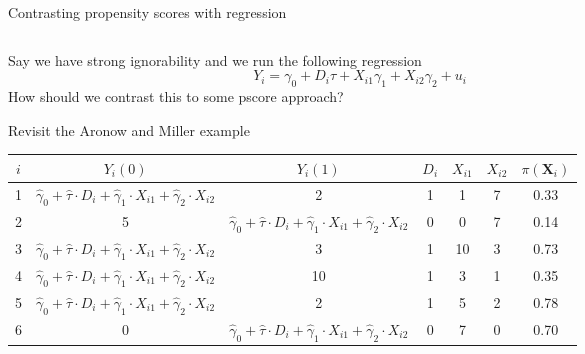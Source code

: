 \documentclass[notes,11pt, aspectratio=169]{beamer}
\newenvironment{wideitemize}{\itemize\addtolength{\itemsep}{10pt}}{\enditemize}
\begin{document}
\begin{frame}{Contrasting propensity scores with regression}
\begin{columns}[T] %
\begin{column}{.8\textwidth}
  \begin{wideitemize}
  \item Say we have strong ignorability and we run the following regression
    \begin{equation*}
      Y_{i} = \gamma_{0} + D_{i}\tau + X_{i1}\gamma_{1} + X_{i2}\gamma_{2} + u_{i}
    \end{equation*}
    How should we contrast this to some pscore approach?
    \pause
  \item Revisit the Aronow and Miller example
    \end{wideitemize}
  \begin{tabular}{ccccccc}
    $i$ & $Y_{i}(0)$ & $Y_{i}(1)$ & $D_{i}$ & $X_{i1}$ & $X_{i2}$ & $\pi(\mathbf{X}_{i})$\\
    \midrule
    1 & $\hat{\gamma}_{0} + \hat{\tau} \cdot D_{i} + \hat{\gamma}_{1} \cdot X_{i1} + \hat{\gamma}_{2} \cdot X_{i2}$  & 2 & 1 & 1 & 7 & 0.33\\
    2 & 5 & $\hat{\gamma}_{0} + \hat{\tau} \cdot D_{i} + \hat{\gamma}_{1} \cdot X_{i1} + \hat{\gamma}_{2} \cdot X_{i2}$ & 0 & 0 & 7 & 0.14\\    
    3 & $\hat{\gamma}_{0} + \hat{\tau} \cdot D_{i} + \hat{\gamma}_{1} \cdot X_{i1} + \hat{\gamma}_{2} \cdot X_{i2}$ & 3 & 1 & 10 & 3 & 0.73\\
    4 & $\hat{\gamma}_{0} + \hat{\tau} \cdot D_{i} + \hat{\gamma}_{1} \cdot X_{i1} + \hat{\gamma}_{2} \cdot X_{i2}$ & 10 & 1 & 3 & 1 & 0.35\\
    5 & $\hat{\gamma}_{0} + \hat{\tau} \cdot D_{i} + \hat{\gamma}_{1} \cdot X_{i1} + \hat{\gamma}_{2} \cdot X_{i2}$ & 2 & 1 & 5 & 2 & 0.78\\
    6 & 0 & $\hat{\gamma}_{0} + \hat{\tau} \cdot D_{i} + \hat{\gamma}_{1} \cdot X_{i1} + \hat{\gamma}_{2} \cdot X_{i2}$ & 0 & 7 & 0 & 0.70\\        
  \end{tabular}
\end{column}%
\hfill%
\begin{column}{.4\textwidth}

\end{column}%
\end{columns}
\end{frame}
\end{document}
